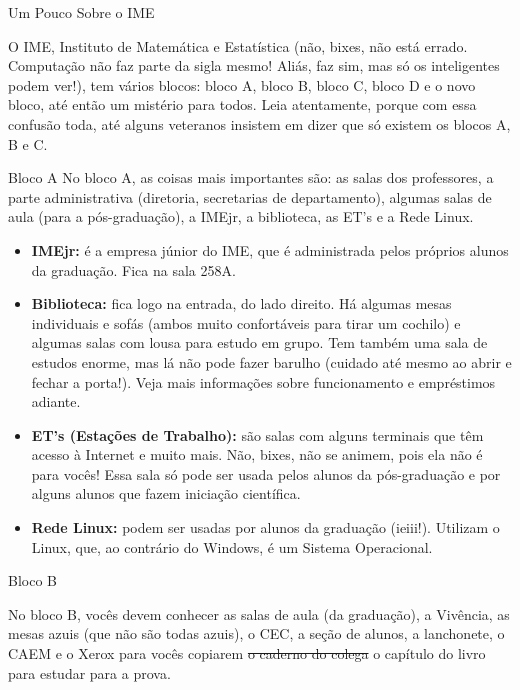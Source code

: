 \begin{secao}{Um Pouco Sobre o IME}

O IME, Instituto de Matemática e Estatística (não, bixes, não está errado.
Computação não faz parte da sigla mesmo! Aliás, faz sim, mas só os inteligentes
podem ver!), tem vários blocos: bloco A, bloco B, bloco C, bloco D e o
novo bloco, até então um mistério para todos. Leia atentamente, porque com essa
confusão toda, até alguns veteranos insistem em dizer que só existem os blocos
A, B e C.


\begin{subsecao}{Bloco A}
No bloco A, as coisas mais importantes são: as salas dos professores, a parte
administrativa (diretoria, secretarias de departamento), algumas salas de aula
(para a pós-graduação), a IMEjr, a biblioteca, as ET's e a Rede Linux.

\begin{itemize}

\item {\bf IMEjr:} é a empresa júnior do IME, que é administrada pelos próprios
alunos da graduação. Fica na sala 258A.

\item {\bf Biblioteca:} fica logo na entrada, do lado direito. Há algumas mesas
individuais e sofás (ambos muito confortáveis para tirar um cochilo) e algumas salas
com lousa para estudo em grupo. Tem também uma sala de estudos enorme, 
mas lá não pode fazer barulho (cuidado até mesmo ao abrir e fechar a porta!).
Veja mais informações sobre funcionamento e empréstimos adiante.

\item {\bf ET's (Estações de Trabalho):} são salas com alguns terminais que têm
acesso à Internet e muito mais. Não, bixes, não se animem, pois ela não é para
vocês! Essa sala só pode ser usada pelos alunos da pós-graduação e por alguns
alunos que fazem iniciação científica.

\item {\bf Rede Linux:} podem ser usadas por alunos da graduação (ieiii!).
Utilizam o Linux, que, ao contrário do Windows, é um Sistema Operacional.

\end{itemize}

\end{subsecao}

\begin{subsecao}{Bloco B}


No bloco B, vocês devem conhecer as salas de aula (da graduação), a Vivência, as
mesas azuis (que não são todas azuis), o CEC, a seção de alunos, a lanchonete, 
o CAEM e o Xerox para vocês copiarem \sout{o caderno do colega} o capítulo do 
livro para estudar para a prova.


\end{subsecao}
\end{secao}
